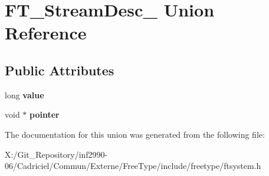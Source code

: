\hypertarget{union_f_t___stream_desc__}{\section{F\-T\-\_\-\-Stream\-Desc\-\_\- Union Reference}
\label{union_f_t___stream_desc__}
}
\subsection*{Public Attributes}
\begin{DoxyCompactItemize}
\item 
\hypertarget{union_f_t___stream_desc___a1a94493032faef1c3ed7bc33816ce90c}{long {\bfseries value}}\label{union_f_t___stream_desc___a1a94493032faef1c3ed7bc33816ce90c}

\item 
\hypertarget{union_f_t___stream_desc___a410ed102dc377fb9a5b9c950c3f863dc}{void $\ast$ {\bfseries pointer}}\label{union_f_t___stream_desc___a410ed102dc377fb9a5b9c950c3f863dc}

\end{DoxyCompactItemize}


The documentation for this union was generated from the following file\-:\begin{DoxyCompactItemize}
\item 
X\-:/\-Git\-\_\-\-Repository/inf2990-\/06/\-Cadriciel/\-Commun/\-Externe/\-Free\-Type/include/freetype/ftsystem.\-h\end{DoxyCompactItemize}
